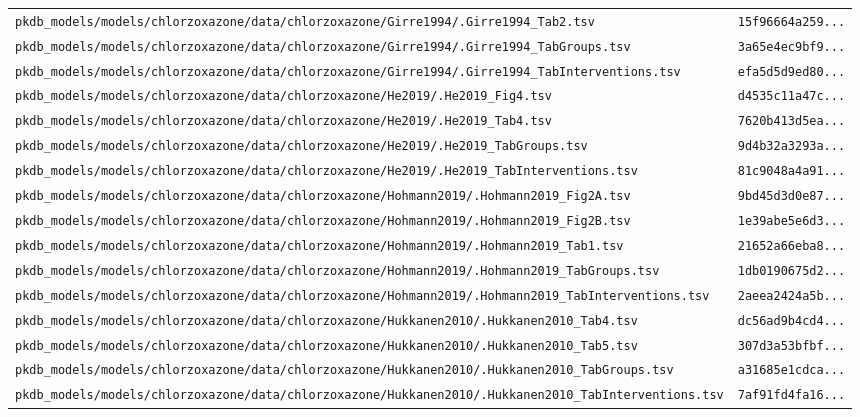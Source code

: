 \begin{longtable}{ll}
\texttt{pkdb\_models/models/chlorzoxazone/data/chlorzoxazone/Girre1994/.Girre1994\_Tab2.tsv} & \texttt{15f96664a259...} \\
\texttt{pkdb\_models/models/chlorzoxazone/data/chlorzoxazone/Girre1994/.Girre1994\_TabGroups.tsv} & \texttt{3a65e4ec9bf9...} \\
\texttt{pkdb\_models/models/chlorzoxazone/data/chlorzoxazone/Girre1994/.Girre1994\_TabInterventions.tsv} & \texttt{efa5d5d9ed80...} \\
\texttt{pkdb\_models/models/chlorzoxazone/data/chlorzoxazone/He2019/.He2019\_Fig4.tsv} & \texttt{d4535c11a47c...} \\
\texttt{pkdb\_models/models/chlorzoxazone/data/chlorzoxazone/He2019/.He2019\_Tab4.tsv} & \texttt{7620b413d5ea...} \\
\texttt{pkdb\_models/models/chlorzoxazone/data/chlorzoxazone/He2019/.He2019\_TabGroups.tsv} & \texttt{9d4b32a3293a...} \\
\texttt{pkdb\_models/models/chlorzoxazone/data/chlorzoxazone/He2019/.He2019\_TabInterventions.tsv} & \texttt{81c9048a4a91...} \\
\texttt{pkdb\_models/models/chlorzoxazone/data/chlorzoxazone/Hohmann2019/.Hohmann2019\_Fig2A.tsv} & \texttt{9bd45d3d0e87...} \\
\texttt{pkdb\_models/models/chlorzoxazone/data/chlorzoxazone/Hohmann2019/.Hohmann2019\_Fig2B.tsv} & \texttt{1e39abe5e6d3...} \\
\texttt{pkdb\_models/models/chlorzoxazone/data/chlorzoxazone/Hohmann2019/.Hohmann2019\_Tab1.tsv} & \texttt{21652a66eba8...} \\
\texttt{pkdb\_models/models/chlorzoxazone/data/chlorzoxazone/Hohmann2019/.Hohmann2019\_TabGroups.tsv} & \texttt{1db0190675d2...} \\
\texttt{pkdb\_models/models/chlorzoxazone/data/chlorzoxazone/Hohmann2019/.Hohmann2019\_TabInterventions.tsv} & \texttt{2aeea2424a5b...} \\
\texttt{pkdb\_models/models/chlorzoxazone/data/chlorzoxazone/Hukkanen2010/.Hukkanen2010\_Tab4.tsv} & \texttt{dc56ad9b4cd4...} \\
\texttt{pkdb\_models/models/chlorzoxazone/data/chlorzoxazone/Hukkanen2010/.Hukkanen2010\_Tab5.tsv} & \texttt{307d3a53bfbf...} \\
\texttt{pkdb\_models/models/chlorzoxazone/data/chlorzoxazone/Hukkanen2010/.Hukkanen2010\_TabGroups.tsv} & \texttt{a31685e1cdca...} \\
\texttt{pkdb\_models/models/chlorzoxazone/data/chlorzoxazone/Hukkanen2010/.Hukkanen2010\_TabInterventions.tsv} & \texttt{7af91fd4fa16...} \\

\end{longtable}
